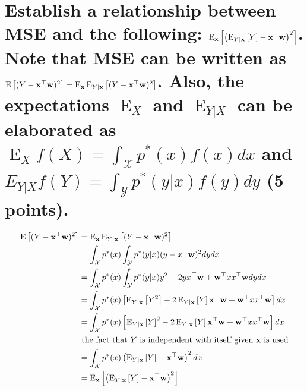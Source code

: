 \documentclass[twoside]{article}
\newcommand{\x}{{\bf x}}
\newcommand{\w}{{\bf w}}
\newcommand{\on}{\operatorname}
\newcommand{\E}{\on{E} }
\begin{document}
\newpage

\section{\normalsize 
Establish a relationship between MSE and the following: $\E_{\x}\left[ \left( \E_{Y|{\x}}\left[ Y\right] - \x^\top\w \right)^2 \right]$.
Note that MSE can be written as $\E\left[ (Y - \x^\top \w)^2 \right] = \E_{\x}\E_{Y|{\x}}\left[ (Y - \x^\top \w)^2 \right]$. Also, the expectations $\E_{X}$ and $\E_{Y|X}$ can be elaborated as $\E_{X} f(X) = \int_{\mathcal{X}} p^*(x) f(x) dx$ and $E_{Y|X} f(Y) = \int_{\mathcal{Y}} p^*(y|x) f(y) dy$
(5 points).
}

\begin{align*}
	\E\left[ (Y - \x^\top \w)^2 \right] &= \E_{\x}\E_{Y|{\x}}\left[ (Y - \x^\top \w)^2 \right]\\
	&=\int_{\mathcal{X}} p^*(x) \int_{\mathcal{Y}} p^*(y|x) (y - x^\top \w)^2 dy dx\\
	&=\int_{\mathcal{X}} p^*(x) \int_{\mathcal{Y}} p^*(y|x) y^2 - 2yx^\top\w + \w^\top xx^\top \w dy dx\\
	&=\int_{\mathcal{X}} p^*(x) \left[\E_{Y|\x}\left[Y^2\right] -2\E_{Y|\x}\left[Y\right]\x^\top\w+ \w^\top xx^\top \w \right]dx\\
	&=\int_{\mathcal{X}} p^*(x) \left[\E_{Y|\x}\left[Y\right]^2 -2\E_{Y|\x}\left[Y\right]\x^\top\w+ \w^\top xx^\top \w \right]dx\\
	&\text{ the fact that $Y$ is independent with itself given $\x$ is used}\\
	&=\int_{\mathcal{X}} p^*(x) \left( \E_{Y|{\x}}\left[ Y\right] - \x^\top\w \right)^2 dx\\
	&=\E_{\x}\left[ \left( \E_{Y|{\x}}\left[ Y\right] - \x^\top\w \right)^2 \right]
\end{align*}


\end{document}
